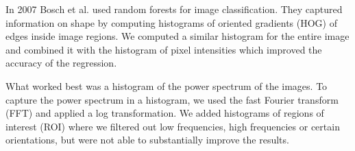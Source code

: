 \documentclass[10pt,conference,compsocconf]{IEEEtran}
\begin{document}
In 2007 Bosch et al. \cite{Bosch} used random forests for image classification. They captured information on shape by computing histograms of oriented gradients (HOG) of edges inside image regions. We computed a similar histogram for the entire image and combined it with the histogram of pixel intensities which improved the accuracy of the regression.

What worked best was a histogram of the power spectrum of the images. To capture the power spectrum in a histogram, we used the fast Fourier transform (FFT) and applied a log transformation. We added histograms of regions of interest (ROI) where we filtered out low frequencies, high frequencies or certain orientations, but were not able to substantially improve the results.

\end{document}
